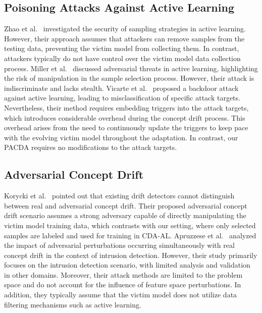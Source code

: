 \documentclass[conference,compsoc]{IEEEtran} %
\begin{document}
\subsection{Poisoning Attacks Against Active Learning}
Zhao et al.~\cite{zhao2012sampling} investigated the security of sampling strategies in active learning. 
However, their approach assumes that attackers can remove samples from the testing data, preventing the victim model from collecting them. 
In contrast, attackers typically do not have control over the victim model  data collection process.
Miller et al.~\cite{miller2014adversarial} discussed adversarial threats in active learning, highlighting the risk of manipulation in the sample selection process. However, their attack is indiscriminate and lacks stealth.
Vicarte et al.~\cite{2021-Usenix-active-learning-backdoor} proposed a backdoor attack against active learning, leading to misclassification of specific attack targets.
Nevertheless, their method requires embedding triggers into the attack targets, which introduces considerable overhead during the concept drift process.
This overhead arises from the need to continuously update the triggers to keep pace with the evolving victim model throughout the adaptation.
In contrast, our PACDA requires no modifications to the attack targets.

\subsection{Adversarial Concept Drift}
Korycki et al.~\cite{2023-CCF-B-Adversarial-concept-drift-detection-under-poisoning-attacks} pointed out that existing drift detectors cannot distinguish between real and adversarial concept drift. 
Their proposed adversarial concept drift scenario assumes a strong adversary capable of directly manipulating the victim model  training data, which contrasts with our setting, where only selected samples are labeled and used for training in CDA-AL.
Apruzzese et al.~\cite{apruzzese2024adversarial} analyzed the impact of adversarial perturbations occurring simultaneously with real concept drift in the context of intrusion detection.
However, their study primarily focuses on the intrusion detection scenario, with limited analysis and validation in other domains.
Moreover, their attack methods are limited to the problem space and do not account for the influence of feature space perturbations. In addition, they typically assume that the victim model does not utilize data filtering mechanisms such as active learning.
\end{document}
